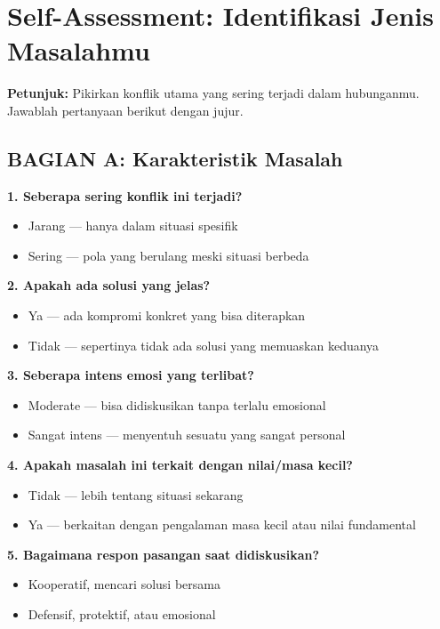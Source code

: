 \section{Self-Assessment: Identifikasi Jenis Masalahmu}

\begin{exercisebox}
\textbf{Petunjuk:} Pikirkan konflik utama yang sering terjadi dalam hubunganmu. Jawablah pertanyaan berikut dengan jujur.

\subsection*{BAGIAN A: Karakteristik Masalah}

\textbf{1. Seberapa sering konflik ini terjadi?}
\begin{itemize}
    \item[A] Jarang --- hanya dalam situasi spesifik
    \item[B] Sering --- pola yang berulang meski situasi berbeda
\end{itemize}

\textbf{2. Apakah ada solusi yang jelas?}
\begin{itemize}
    \item[A] Ya --- ada kompromi konkret yang bisa diterapkan
    \item[B] Tidak --- sepertinya tidak ada solusi yang memuaskan keduanya
\end{itemize}

\textbf{3. Seberapa intens emosi yang terlibat?}
\begin{itemize}
    \item[A] Moderate --- bisa didiskusikan tanpa terlalu emosional
    \item[B] Sangat intens --- menyentuh sesuatu yang sangat personal
\end{itemize}

\textbf{4. Apakah masalah ini terkait dengan nilai/masa kecil?}
\begin{itemize}
    \item[A] Tidak --- lebih tentang situasi sekarang
    \item[B] Ya --- berkaitan dengan pengalaman masa kecil atau nilai fundamental
\end{itemize}

\textbf{5. Bagaimana respon pasangan saat didiskusikan?}
\begin{itemize}
    \item[A] Kooperatif, mencari solusi bersama
    \item[B] Defensif, protektif, atau emosional
\end{itemize}


\end{exercisebox}
